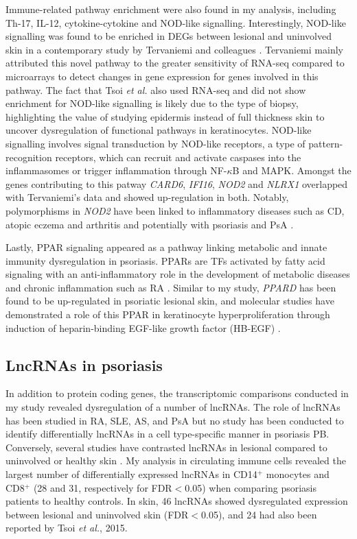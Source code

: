Immune-related pathway enrichment were also found in my analysis, including Th-17, IL-12, cytokine-cytokine and NOD-like signalling. Interestingly, NOD-like signalling was found to be enriched in DEGs between lesional and uninvolved skin in a contemporary study by Tervaniemi and colleagues \parencite{Tervaniemi2016}. Tervaniemi mainly attributed this novel pathway to the greater sensitivity of RNA-seq compared to microarrays to detect changes in gene expression for genes involved in this pathway. The fact that Tsoi \textit{et al.} also used RNA-seq and did not show enrichment for NOD-like signalling is likely due to the type of biopsy, highlighting the value of studying epidermis instead of full thickness skin to uncover dysregulation of functional pathways in keratinocytes. NOD-like signalling involves signal transduction by NOD-like receptors, a type of pattern-recognition receptors, which can recruit and activate caspases into the inflammasomes or trigger inflammation through NF-$\kappa$B and MAPK.  Amongst the genes contributing to this patway \textit{CARD6}, \textit{IFI16}, \textit{NOD2} and \textit{NLRX1} overlapped with Tervaniemi’s data and showed up-regulation in both. Notably, polymorphisms in \textit{NOD2} have been linked to inflammatory diseases such as CD, atopic eczema and arthritis and potentially with psoriasis and PsA \parencite{Zhong2013,Zhu2012}.

Lastly, PPAR signaling appeared as a pathway linking metabolic and innate immunity dysregulation in psoriasis. PPARs are TFs activated by fatty acid signaling with an anti-inflammatory role in the development of metabolic diseases and chronic inflammation such as RA \parencite{Straus2007,Ji2001}. Similar to my study, \textit{PPARD} has been found to be up-regulated in psoriatic lesional skin, and molecular studies have demonstrated a role of this PPAR  in keratinocyte hyperproliferation through induction of heparin-binding EGF-like growth factor (HB-EGF) \parencite{Romanowska2008}.

\subsection{LncRNAs in psoriasis}
In addition to protein coding genes, the transcriptomic comparisons conducted in my study revealed dysregulation of a number of lncRNAs. The role of lncRNAs has been studied in RA, SLE, AS, and PsA \parencite{Muller2014,Shi2014,Zhang2017, Dolcino2018} but no study has been conducted to identify differentially lncRNAs in a cell type-specific manner in psoriasis PB. Conversely, several studies have contrasted lncRNAs in lesional compared to uninvolved or healthy skin \parencite{Li2014, Ahn2016, Gupta2016, Tsoi2015}. My analysis in circulating immune cells revealed the largest number of differentially expressed lncRNAs in CD14$^+$ monocytes and CD8$^+$ (28 and 31, respectively for FDR$<$0.05) when comparing psoriasis patients to healthy controls. In skin, 46 lncRNAs showed dysregulated expression between lesional and uninvolved skin (FDR$<$0.05), and 24 had also been reported by Tsoi \textit{et al.}, 2015.    

